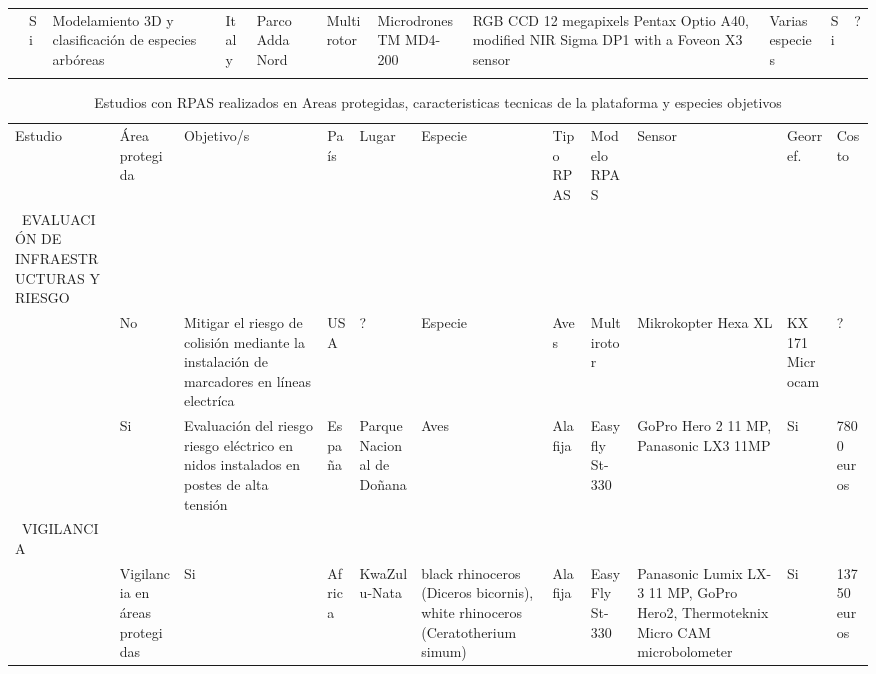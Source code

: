 \documentclass[9t,twocolumn]{article}
\begin{document}
\begin{sidewaystable}
\begin{tabular}{p{2.5cm}p{1cm}p{3cm}p{1cm}p{2cm}p{2cm}p{1cm}p{2cm}p{2cm}p{1cm}p{0.5cm}}
  \cite{Gini2012}  & Si & Modelamiento 3D y clasificación de especies arbóreas & Italy & Parco Adda Nord
    & Multirotor  &  MicrodronesTM MD4-200 & RGB CCD 12 megapixels Pentax Optio A40, modified NIR Sigma DP1 with a Foveon X3 sensor & Varias especies & Si & ?  \\

\\ \cmidrule(r){1-11}



\end{tabular}
\end{sidewaystable}

\begin{sidewaystable}
  \centering
  \captionsetup{font=scriptsize,labelfont=scriptsize}
  \caption{Estudios con RPAS realizados en Areas protegidas, caracteristicas tecnicas de la plataforma y especies objetivos}
  \label{my-label}
  \tiny
  \begin{tabular}{p{2.5cm}p{1cm}p{3cm}p{1cm}p{2cm}p{2cm}p{1cm}p{2cm}p{2cm}p{1cm}p{0.5cm}}
  \cmidrule(r){1-11}
  
  Estudio & Área protegida & Objetivo/s & País & Lugar & Especie & Tipo RPAS & Modelo RPAS & Sensor & Georref. & Costo \\ \cmidrule(r){1-11}
  
  
  \ EVALUACIÓN DE INFRAESTRUCTURAS Y RIESGO \\
  
  \cite{Lobermeier2015} & No  & Mitigar el riesgo de colisión mediante la instalación de marcadores en líneas electríca & USA & ? & Especie& Aves  & Multirotor  & Mikrokopter Hexa XL  & KX 171 Microcam & ?  \\ 
  
  \cite{Mulero-Pazmany2014a} & Si  & Evaluación del riesgo riesgo eléctrico en nidos instalados en postes de alta tensión & España & Parque Nacional de Doñana &  Aves  & Ala fija  & Easy fly St-330 & GoPro Hero 2 11 MP, Panasonic LX3 11MP & Si & 7800 euros  \\ 
  
  
  \ VIGILANCIA \\ 
  
  \cite{Mulero-Pazmany2014}  & Vigilancia en áreas protegidas & Si & Africa & KwaZulu-Nata & black rhinoceros
  (Diceros bicornis), white rhinoceros (Ceratotherium simum)  & Ala fija  & Easy Fly St-330 & Panasonic Lumix LX-3 11 MP, GoPro Hero2, Thermoteknix Micro CAM microbolometer & Si & 13750 euros  \\ 


\end{tabular}
\end{sidewaystable}
\end{document}
